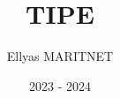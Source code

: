 \documentclass[11pt]{article}
\title{\textbf{TIPE}}
\author{Ellyas MARITNET}
\date{2023 - 2024}
\begin{document}
\newtheorem{Th}{Théorème}
\newtheorem{Demo}{Démonstration}
\newtheorem{Def}{Définition}

\maketitle
\thispagestyle{empty}
\end{document}
